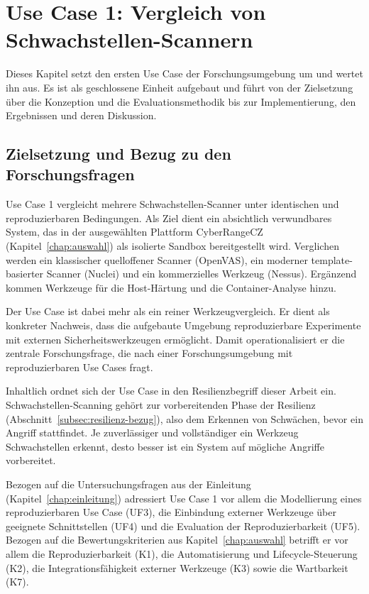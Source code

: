 \chapter{Use Case 1: Vergleich von Schwachstellen-Scannern}
\label{chap:uc1}

Dieses Kapitel setzt den ersten Use Case der Forschungsumgebung um und wertet ihn aus. Es ist als
geschlossene Einheit aufgebaut und führt von der Zielsetzung über die Konzeption und die
Evaluationsmethodik bis zur Implementierung, den Ergebnissen und deren Diskussion.

\section{Zielsetzung und Bezug zu den Forschungsfragen}
\label{sec:uc1-ziel}

Use Case 1 vergleicht mehrere Schwachstellen-Scanner unter identischen und reproduzierbaren
Bedingungen. Als Ziel dient ein absichtlich verwundbares System, das in der ausgewählten Plattform
CyberRangeCZ (Kapitel~\ref{chap:auswahl}) als isolierte Sandbox bereitgestellt wird. Verglichen
werden ein klassischer quelloffener Scanner (OpenVAS), ein moderner template-basierter Scanner
(Nuclei) und ein kommerzielles Werkzeug (Nessus). Ergänzend kommen Werkzeuge für die Host-Härtung
und die Container-Analyse hinzu.

Der Use Case ist dabei mehr als ein reiner Werkzeugvergleich. Er dient als konkreter Nachweis, dass
die aufgebaute Umgebung reproduzierbare Experimente mit externen Sicherheitswerkzeugen ermöglicht.
Damit operationalisiert er die zentrale Forschungsfrage, die nach einer Forschungsumgebung mit
reproduzierbaren Use Cases fragt.

Inhaltlich ordnet sich der Use Case in den Resilienzbegriff dieser Arbeit ein.
Schwachstellen-Scanning gehört zur vorbereitenden Phase der Resilienz
(Abschnitt~\ref{subsec:resilienz-bezug}), also dem Erkennen von Schwächen, bevor ein Angriff
stattfindet. Je zuverlässiger und vollständiger ein Werkzeug Schwachstellen erkennt, desto besser
ist ein System auf mögliche Angriffe vorbereitet.

Bezogen auf die Untersuchungsfragen aus der Einleitung (Kapitel~\ref{chap:einleitung}) adressiert Use Case 1
vor allem die Modellierung eines reproduzierbaren Use Case (UF3), die Einbindung externer Werkzeuge
über geeignete Schnittstellen (UF4) und die Evaluation der Reproduzierbarkeit (UF5). Bezogen auf die
Bewertungskriterien aus Kapitel~\ref{chap:auswahl} betrifft er vor allem die Reproduzierbarkeit (K1), die
Automatisierung und Lifecycle-Steuerung (K2), die Integrationsfähigkeit externer Werkzeuge (K3)
sowie die Wartbarkeit (K7).


